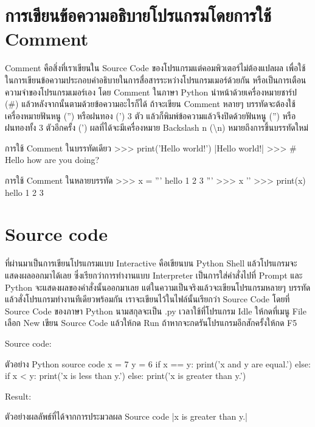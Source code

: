 \section{การเขียนข้อความอธิบายโปรแกรมโดยการใช้ Comment}

Comment คือสิ่งที่เราเขียนใน Source Code ของโปรแกรมแต่คอมพิวเตอร์ไม่ต้องแปลผล เพื่อใช้ในการเขียนข้อความประกอบคำอธิบายในการสื่อสารระหว่างโปรแกรมเมอร์ด้วยกัน หรือเป็นการเตือนความจำของโปรแกรมเมอร์เอง โดย Comment ในภาษา Python นำหน้าด้วยเครื่องหมายชาร์ป (\#) แล้วหลังจากนั้นตามด้วยข้อความอะไรก็ได้ ถ้าจะเขียน Comment หลายๆ บรรทัดจะต้องใช้เครื่องหมายฟันหนู ('') หรือฝนทอง (')  3 ตัว แล้วก็พิมพ์ข้อความแล้วจึงปิดด้วยฟันหนู ('') หรือฝนทองทั้ง 3 ตัวอีกครั้ง (') ผลที่ได้จะมีเครื่องหมาย Backslash n (\textbackslash n) หมายถึงการขึ้นบรรทัดใหม่

\begin{codelist}{การใช้ Comment ในบรรทัดเดียว}{}
>>> print('Hello world!')
|Hello world!|
>>> # Hello how are you doing?
\end{codelist}

\begin{codelist}{การใช้ Comment ในหลายบรรทัด}{}
>>> x = '''
hello
1
2
3
'''
>>> x
'\nhello{}\n'
>>> print(x)
hello
1
2
3
\end{codelist}


\section{Source code}

ที่ผ่านมาเป็นการเขียนโปรแกรมแบบ Interactive คือเขียนบน Python Shell แล้วโปรแกรมจะแสดงผลออกมาได้เลย ซึ่งเรียกว่าการทำงานแบบ Interpreter เป็นการใส่คำสั่งไปที่ Prompt และ Python จะแสดงผลของคำสั่งนั้นออกมาเลย แต่ในความเป็นจริงแล้วจะเขียนโปรแกรมหลายๆ บรรทัดแล้วสั่งโปรแกรมทำงานทีเดียวพร้อมกัน เราจะเขียนไว้ในไฟล์นั้นเรียกว่า Source Code โดยที่ Source Code ของภาษา Python นามสกุลจะเป็น .py เวลาใช้ที่โปรแกรม Idle ให้กดที่เมนู File เลือก New เขียน Source Code แล้วให้กด Run ถ้าหากจะกดรันโปรแกรมอีกสักครั้งให้กด F5

Source code:

\begin{codelist}{ตัวอย่าง Python source code}{}
x = 7
y = 6
if x == y: print('x and y are equal.')
else:
    if x < y: print('x is less than y.')
    else: print('x is greater than y.')
\end{codelist}

Result:

\begin{codelist}{ตัวอย่างผลลัพธ์ที่ได้จากการประมวลผล Source code}{}
|x is greater than y.|
\end{codelist}


